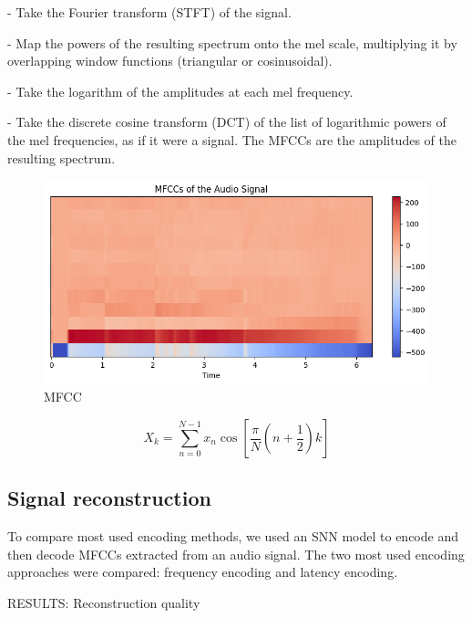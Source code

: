 \documentclass[11pt]{article}
\begin{document}
- Take the Fourier transform (STFT) of the signal.

- Map the powers of the resulting spectrum onto the mel scale, multiplying it by overlapping window functions (triangular or cosinusoidal).

- Take the logarithm of the amplitudes at each mel frequency.

- Take the discrete cosine transform (DCT) of the list of logarithmic powers of the mel frequencies, as if it were a signal. The MFCCs are the amplitudes of the resulting spectrum.


\begin{figure}[h]
  \centering
  \begin{minipage}{0.75\textwidth}
    \centering
    \includegraphics[width=1\textwidth]{"image/MFCC_piano.png"}
    \caption{MFCC}
    \label{fig:MFCC_piano}
  \end{minipage}\hfill
\end{figure}



\begin{equation}
  X_k = \sum_{n=0}^{N-1} x_n \cos \left[ \frac{\pi}{N} \left( n + \frac{1}{2} \right) k \right]
  \label{eq:dct}
\end{equation}



\subsection{Signal reconstruction}

To compare most used encoding methods, we used an SNN model to encode and then decode MFCCs extracted from an audio signal. The two most used encoding approaches were compared: frequency encoding and latency encoding.

RESULTS: Reconstruction quality
\end{document}

